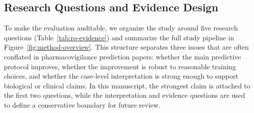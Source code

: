 \documentclass[manuscript,screen,review]{acmart}
\begin{document}
\subsection{Research Questions and Evidence Design}

To make the evaluation auditable, we organize the study around five research questions (Table~\ref{tab:rq-evidence}) and summarize the full study pipeline in Figure~\ref{fig:method-overview}. This structure separates three issues that are often conflated in pharmacovigilance prediction papers: whether the main predictive protocol improves, whether the improvement is robust to reasonable training choices, and whether the case-level interpretation is strong enough to support biological or clinical claims. In this manuscript, the strongest claim is attached to the first two questions, while the interpretation and evidence questions are used to define a conservative boundary for future review.
\end{document}
